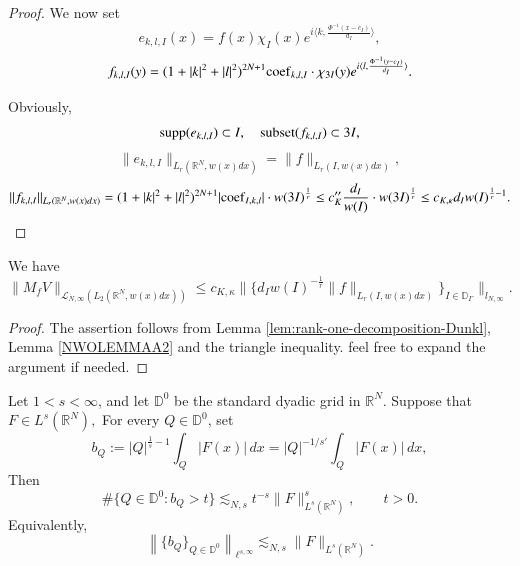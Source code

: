 \documentclass[12pt]{amsart}
\begin{document}
\begin{proof}
We now set
$$e_{k,l,I}(x)=f(x)\chi_I(x)e^{i\langle k,\frac{\Phi^{-1}(x-c_I)}{d_I}\rangle},$$
$$f_{k,l,I}(y)=(1+|k|^2+|l|^2)^{2N+1}{\rm coef}_{k,l,I}\cdot \chi_{3I}(y)e^{i\langle l,\frac{\Phi^{-1}(y-c_I)}{d_I}\rangle}.$$

Obviously,
$${\rm supp}(e_{k,l,I})\subset I,\quad {\rm subset}(f_{k,l,I})\subset 3I,$$
$$\|e_{k,l,I}\|_{L_r(\mathbb{R}^N,w(x)dx)}=\|f\|_{L_r(I,w(x)dx)},$$
$$\|f_{k,l,I}\|_{L_r(\mathbb{R}^N,w(x)dx)}=(1+|k|^2+|l|^2)^{2N+1}|{\rm coef}_{I,k,l}|\cdot w(3I)^{\frac1r}\leq c_K''\frac{d_I}{w(I)}\cdot w(3I)^{\frac1r}\leq c_{K,\kappa}d_Iw(I)^{\frac1r-1}.$$
\end{proof}

\begin{lemma}\label{intermediate cwikel estimate} We have
$$\|M_fV\|_{\mathcal{L}_{N,\infty}(L_2(\mathbb{R}^N,w(x)dx))}\leq c_{K,\kappa}\Big\|\Big\{d_Iw(I)^{-\frac1r}\|f\|_{L_r(I,w(x)dx)}\Big\}_{I\in\mathbb{D}_{\Gamma}}\Big\|_{l_{N,\infty}}.$$
\end{lemma}
\begin{proof} The assertion follows from Lemma \ref{lem:rank-one-decomposition-Dunkl}, Lemma \ref{NWOLEMMAA2} and the triangle inequality. {\color{red} feel free to expand the argument if needed.}
\end{proof}

\begin{lemma}\label{lem:Cwikel-dyadic-distribution}
Let $1<s<\infty$, and let $\mathbb D^0$ be the standard dyadic grid
in $\mathbb R^N$. Suppose that
$
F\in L^s(\mathbb R^N),
$
For every $Q\in\mathbb D^0$, set
\[
b_Q
:=
|Q|^{\frac1s-1}\int_Q |F(x)|\,dx
=
|Q|^{-1/s'}\int_Q |F(x)|\,dx,
\]
Then
\begin{equation}\label{eq:Cwikel-dyadic-distribution}
\#\bigl\{Q\in\mathbb D^0:b_Q>t\bigr\}
\lesssim_{N,s}
t^{-s}\|F\|_{L^s(\mathbb R^N)}^s,
\qquad t>0.
\end{equation}
Equivalently,
\[
\left\|\{b_Q\}_{Q\in\mathbb D^0}\right\|_{\ell^{s,\infty}}
\lesssim_{N,s}
\|F\|_{L^s(\mathbb R^N)}.
\]
\end{lemma}
\end{document}
